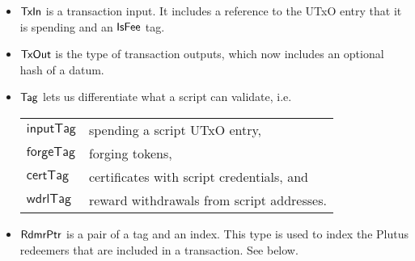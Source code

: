 \begin{itemize}
  \item $\mathsf{TxIn}$ is a transaction input. It includes a reference to the UTxO entry that it is spending
  and an $\mathsf{IsFee}$ tag.

  \item $\mathsf{TxOut}$ is the type of transaction outputs, which now includes an optional hash of a datum.

  \item $\mathsf{Tag}$ lets us differentiate what a script
  can validate, i.e. \\
  \begin{tabular}{l@{~to validate~}l}
  $\mathsf{inputTag}$ & spending a script UTxO entry, \\
  $\mathsf{forgeTag}$ & forging tokens, \\
  $\mathsf{certTag}$  & certificates with script credentials, and  \\
  $\mathsf{wdrlTag}$ & reward withdrawals from script addresses.
  \end{tabular}

  \item $\mathsf{RdmrPtr}$ is a pair of a tag and an index. This type is
  used to index the Plutus redeemers that are included in a transaction. See
  below.

\end{itemize}


